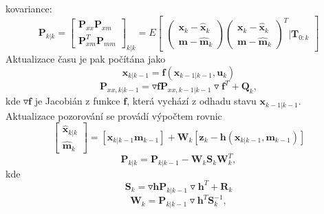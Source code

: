 \documentclass[12pt]{article}
\begin{document}
\indent kovariance:
\begin{equation}
	\textbf{P}_{k|k}=\begin{bmatrix}
	\textbf{P}_{xx} \textbf{P}_{xm}\\\textbf{P}^T_{xm} \textbf{P}_{mm}
	\end{bmatrix}_{k|k}=E\begin{bmatrix}
	\begin{pmatrix}
	\textbf{x}_k-\hat{\textbf{x}}_k\\\textbf{m}-\hat{\textbf{m}}_k
	\end{pmatrix} \begin{pmatrix}
	\textbf{x}_k-\hat{\textbf{x}}_k\\\textbf{m}-\hat{\textbf{m}}_k
	\end{pmatrix}^T |\textbf{T}_{0:k}
	\end{bmatrix}
\end{equation}
Aktualizace času je pak počítána jako
\begin{equation}
\textbf{\^{x}}_{k|k-1}=\textbf{f}(\textbf{\^{x}}_{k-1|k-1},\textbf{u}_{k})
\end{equation}
\begin{equation}
	\textbf{P}_{xx,k|k-1}=\triangledown\textbf{f}\textbf{P}_{xx,k-1|k-1}\triangledown\textbf{f}^T+\textbf{Q}_k,
\end{equation}
kde $\triangledown\textbf{f}$ je Jacobián z funkce $\textbf{f}$, která vychází z odhadu stavu $\textbf{\^{x}}_{k-1|k-1}$.\\
\indent Aktualizace pozorování se provádí výpočtem rovnic
\begin{equation}
	\begin{bmatrix}
	\hat{\textbf{x}}_{k|k}\\\hat{\textbf{m}}_k
	\end{bmatrix}=
	[\textbf{\^{x}}_{k|k-1}\textbf{\^{m}}_{k-1}]+\textbf{W}_{k}[\textbf{z}_k-\textbf{h}(\textbf{\^{x}}_{k|k-1},\textbf{\^{m}}_{k-1})]
\end{equation}
\begin{equation}
	\textbf{P}_{k|k}=\textbf{P}_{k|k-1}-\textbf{W}_k\textbf{S}_k\textbf{W}^T_k,
\end{equation}
kde 
\begin{equation}
	\textbf{S}_k=\triangledown\textbf{h}\textbf{P}_{k|k-1}\triangledown\textbf{h}^T+\textbf{R}_k
\end{equation}
\begin{equation}
	\textbf{W}_k=\textbf{P}_{k|k-1}\triangledown\textbf{h}^T\textbf{S}^{-1}_k,
\end{equation}
\end{document}

